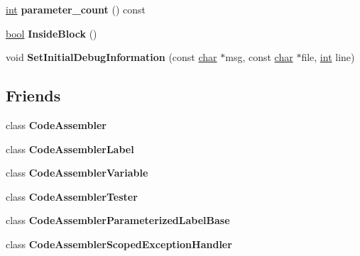 \begin{DoxyCompactItemize}
\mbox{\label{classv8_1_1internal_1_1compiler_1_1CodeAssemblerState_a9e8ebea6de96bf28df01021bb05dcf98}} 
\mbox{\hyperlink{classint}{int}} {\bfseries parameter\+\_\+count} () const
\item 
\mbox{\label{classv8_1_1internal_1_1compiler_1_1CodeAssemblerState_a8c09145edb84d92cf6b6d10e459b7405}} 
\mbox{\hyperlink{classbool}{bool}} {\bfseries Inside\+Block} ()
\item 
\mbox{\label{classv8_1_1internal_1_1compiler_1_1CodeAssemblerState_ad42d06539d8bad1c6755ff44c3ec692b}} 
void {\bfseries Set\+Initial\+Debug\+Information} (const \mbox{\hyperlink{classchar}{char}} $\ast$msg, const \mbox{\hyperlink{classchar}{char}} $\ast$file, \mbox{\hyperlink{classint}{int}} line)
\end{DoxyCompactItemize}
\subsection*{Friends}
\begin{DoxyCompactItemize}
\item 
\mbox{\label{classv8_1_1internal_1_1compiler_1_1CodeAssemblerState_a3b23f262333c9e8e9f3891ea68a40d19}} 
class {\bfseries Code\+Assembler}
\item 
\mbox{\label{classv8_1_1internal_1_1compiler_1_1CodeAssemblerState_aca0848efaaf7dfe4a9f0e487a7aa6a41}} 
class {\bfseries Code\+Assembler\+Label}
\item 
\mbox{\label{classv8_1_1internal_1_1compiler_1_1CodeAssemblerState_a6f92dca8d7591cc3024e4b2b9b6a4b78}} 
class {\bfseries Code\+Assembler\+Variable}
\item 
\mbox{\label{classv8_1_1internal_1_1compiler_1_1CodeAssemblerState_a05cce2eb018d053015c8945e565d5ec1}} 
class {\bfseries Code\+Assembler\+Tester}
\item 
\mbox{\label{classv8_1_1internal_1_1compiler_1_1CodeAssemblerState_a9478c9e415aac59a1c83a3438b2685c5}} 
class {\bfseries Code\+Assembler\+Parameterized\+Label\+Base}
\item 
\mbox{\label{classv8_1_1internal_1_1compiler_1_1CodeAssemblerState_aa28e1467c0619bcd59cde2bcff11b87c}} 
class {\bfseries Code\+Assembler\+Scoped\+Exception\+Handler}
\end{DoxyCompactItemize}


